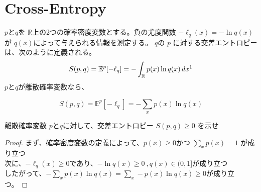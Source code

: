 \documentclass[a4paper]{jsarticle}%
\begin{document}
\maketitle
\vspace{-0.4cm}
\section{\textbf{Cross-Entropy}}
\thispagestyle{plain}
\begin{dfn}\label{def:cross-entropy}
$p$と$q$を $ \mathbb{R} $上の2つの確率密度変数とする。負の尤度関数 $ -\ell_{q}(x)=-\ln q(x) $が $ q(x) $によって与えられる情報を測定する。
$q $の $ p $ に対する交差エントロピーは、次のように定義される。\\
\begin{equation}
  S(p, q) = \mathbb{E}^p[-\ell_q] = -\int_{\mathbb{R}} p(x) \ln q(x) \, dx\footnotemark[1] \label{eq2}
\end{equation}
$p$と$q$が離散確率変数なら、

\begin{equation}
  S(p, q) = \mathbb{E}^p[-\ell_q] = -\sum_{x} p(x) \ln q(x)
\end{equation}


\begin{exercise}
  離散確率変数 $p$と$q$に対して、交差エントロピー $S(p, q)\geq 0$ を示せ\\
\end{exercise}

\begin{proof}
まず、確率密度変数の定義によって、$p(x)\geq 0$かつ $ \displaystyle\sum_{x}p(x)=1 $  が成り立つ\\  
次に、$-\ell_{q}(x)\geq 0$であり、\ie $ -\ln q(x)\geq 0 \ ,q(x)\in (0,1]$が成り立つ\\
したがって、$-\sum_{x} p(x) \ln q(x) = \sum_{x} -p(x) \ln q(x)\geq 0$が成り立つ。
\end{proof}
\end{dfn}
\end{document}
